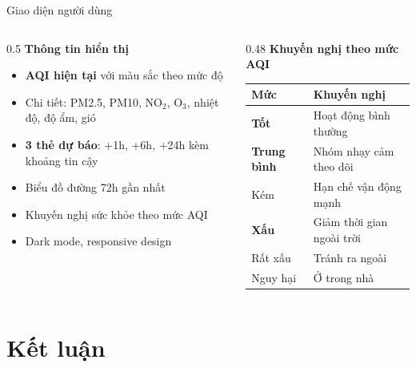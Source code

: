 \documentclass[aspectratio=169]{beamer}
\newcommand{\good}[1]{{\color{cgood}\textbf{#1}}}
\newcommand{\warn}[1]{{\color{cmoderate}\textbf{#1}}}
\newcommand{\bad}[1]{{\color{cunhealthy}\textbf{#1}}}
\begin{document}
\begin{frame}{Giao diện người dùng}
  \begin{columns}[T]
    \begin{column}{0.5\textwidth}
      \textbf{Thông tin hiển thị}
      \begin{itemize}
        \item \textbf{AQI hiện tại} với màu sắc theo mức độ
        \item Chi tiết: PM2.5, PM10, NO$_2$, O$_3$, nhiệt độ, độ ẩm, gió
        \item \textbf{3 thẻ dự báo}: +1h, +6h, +24h kèm khoảng tin cậy
        \item Biểu đồ đường 72h gần nhất
        \item Khuyến nghị sức khỏe theo mức AQI
        \item Dark mode, responsive design
      \end{itemize}
    \end{column}
    \begin{column}{0.48\textwidth}
      \textbf{Khuyến nghị theo mức AQI}
      \begin{center}
        \small
        \begin{tabular}{ll}
          \toprule
          \textbf{Mức} & \textbf{Khuyến nghị} \\
          \midrule
          \good{Tốt}        & Hoạt động bình thường \\
          \warn{Trung bình} & Nhóm nhạy cảm theo dõi \\
          {\color{csensitive}Kém} & Hạn chế vận động mạnh \\
          \bad{Xấu}         & Giảm thời gian ngoài trời \\
          {\color{cvery}Rất xấu} & Tránh ra ngoài \\
          {\color{chazard}Nguy hại} & Ở trong nhà \\
          \bottomrule
        \end{tabular}
      \end{center}
    \end{column}
  \end{columns}
\end{frame}

\section{Kết luận}
\end{document}

